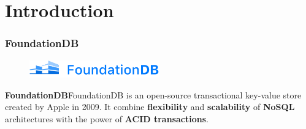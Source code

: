 
\section{Introduction} %


\begin{frame}
\frametitle{FoundationDB}

\begin{figure}
    \centering
    \includegraphics[width=0.5\textwidth]{img/1-Introduction/foundationBD-logo.png}
    
\end{figure}

\textbf{FoundationDB}FoundationDB is an open-source transactional key-value store created by Apple in 2009. It combine \textbf{flexibility} and \textbf{scalability} of \textbf{NoSQL} architectures with the power of \textbf{ACID transactions}.
	
\end{frame}


